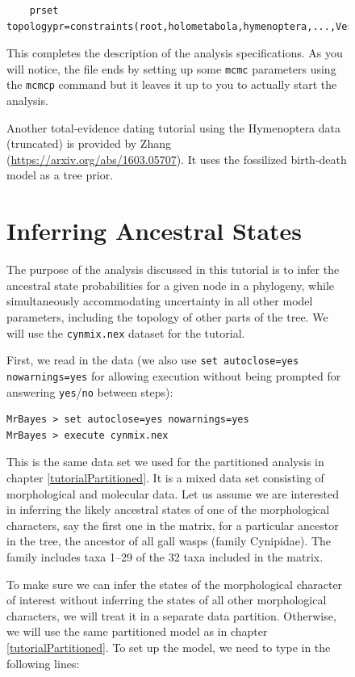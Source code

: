 \documentclass[12pt]{book}
\newcommand{\ttt}[1]{\texttt{#1}}
\begin{document}
\begin{figure}[h]
\small
\begin{verbatim}
    prset topologypr=constraints(root,holometabola,hymenoptera,...,Vespina);
\end{verbatim}
\normalsize

This completes the description of the analysis specifications. As you will notice, the file ends by
setting up some \ttt{mcmc} parameters using the \ttt{mcmcp} command but it leaves it up to you to
actually start the analysis.

Another total-evidence dating tutorial using the Hymenoptera data (truncated) is provided by Zhang (\url{https://arxiv.org/abs/1603.05707}). It uses the fossilized birth-death model \citep{Stadler:2010fn,Heath:2014hn,Zhang:2016kf} as a tree prior.

\section{Inferring Ancestral States}

The purpose of the analysis discussed in this tutorial is to infer the ancestral state
probabilities for a given node in a phylogeny, while simultaneously accommodating uncertainty in
all other model parameters, including the topology of other parts of the tree. We will use the
\ttt{cynmix.nex} dataset for the tutorial.

First, we read in the data (we also use \ttt{set autoclose=yes nowarnings=yes} for allowing
execution without being prompted for answering \ttt{yes}/\ttt{no} between steps):

\small
\begin{singlespacing}
\begin{verbatim}
MrBayes > set autoclose=yes nowarnings=yes
MrBayes > execute cynmix.nex
\end{verbatim}
\end{singlespacing}
\normalsize

This is the same data set we used for the partitioned analysis in chapter
\ref{tutorialPartitioned}. It is a mixed data set consisting of morphological and molecular data.
Let us assume we are interested in inferring the likely ancestral states of one of the
morphological characters, say the first one in the matrix, for a particular ancestor in the tree,
the ancestor of all gall wasps (family Cynipidae). The family includes taxa 1--29 of the 32 taxa
included in the matrix.

To make sure we can infer the states of the morphological character of interest without inferring
the states of all other morphological characters, we will treat it in a separate data partition.
Otherwise, we will use the same partitioned model as in chapter \ref{tutorialPartitioned}. To set
up the model, we need to type in the following lines:


\end{figure}
\end{document}
